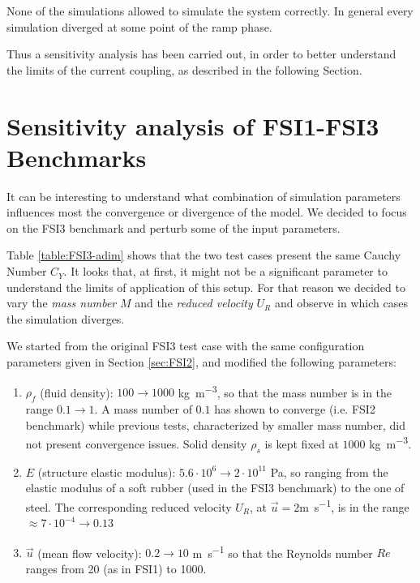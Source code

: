 None of the simulations allowed to simulate the system correctly. In general every simulation diverged at some point of the ramp phase.

Thus a sensitivity analysis has been carried out, in order to better understand the limits of the current coupling, as described in the following Section.


\section{Sensitivity analysis of FSI1-FSI3 Benchmarks}
\label{sec:FSI3-sensitivity}

It can be interesting to understand what combination of simulation parameters influences most the convergence or divergence of the model. We decided to focus on the FSI3 benchmark and perturb some of the input parameters.

Table \ref{table:FSI3-adim} shows that the two test cases present the same Cauchy Number $C_Y$. It looks that, at first, it might not be a significant parameter to understand the limits of application of this setup. For that reason we decided to vary the \textit{mass number} $M$ and the \textit{reduced velocity} $U_R$ and observe in which cases the simulation diverges.

We started from the original FSI3 test case with the same configuration parameters given in Section \ref{sec:FSI2}, and modified the following parameters:

\begin{enumerate}
    \item $\rho_f$ (fluid density): $100\rightarrow1000$ \si{kg.m^{-3}}, so that the mass number is in the range $0.1\rightarrow1$. A mass number of $0.1$ has shown to converge (i.e. FSI2 benchmark) while previous tests, characterized by smaller mass number, did not present convergence issues. Solid density $\rho_s$ is kept fixed at $1000$ \si{kg.m^{-3}}. 
    \item $E$ (structure elastic modulus): $5.6\cdot10^{6}\rightarrow2\cdot10^{11}$ \si{Pa}, so ranging from the elastic modulus of a soft rubber (used in the FSI3 benchmark) to the one of steel. The corresponding reduced velocity $U_R$, at $\vec{u}=2$\si{m.s^{-1}}, is in the range $\approx7\cdot10^{-4}\rightarrow0.13 $
    \item $\vec{u}$ (mean flow velocity): $0.2\rightarrow10$ \si{m.s^{-1}} so that the Reynolds number $Re$ ranges from 20 (as in FSI1) to 1000.
\end{enumerate}

